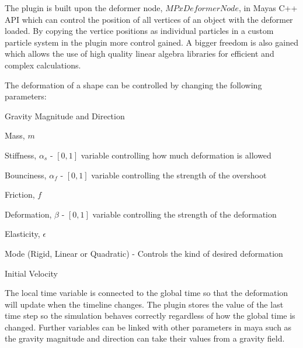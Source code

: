 The plugin is built upon the deformer node, $MPxDeformerNode$, in Mayas C++ API which can control the position of all vertices of an object with the deformer loaded. By copying the vertice positions as individual particles in a custom particle system in the plugin more control gained. A bigger freedom is also gained which allows the use of high quality linear algebra libraries for efficient and complex calculations. 

The deformation of a shape can be controlled by changing the following parameters:

\begin{myitemize} 
  \item Gravity Magnitude and Direction 
  \item Mass, $m$
  \item Stiffness, $\alpha_s$ - $[0,1]$ variable controlling how much deformation is allowed
  \item Bounciness, $\alpha_f$ - $[0,1]$ variable controlling the strength of the overshoot
  \item Friction, $f$
  \item Deformation, $\beta$ - $[0,1]$ variable controlling the strength of the deformation
  \item Elasticity, $\epsilon$
  \item Mode (Rigid, Linear or Quadratic) - Controls the kind of desired deformation 
  \item Initial Velocity 
\end{myitemize}

The local time variable is connected to the global time so that the deformation will update when the timeline changes. The plugin stores the value of the last time step so the simulation behaves correctly regardless of how the global time is changed. Further variables can be linked with other parameters in maya such as the gravity magnitude and direction can take their values from a gravity field.

